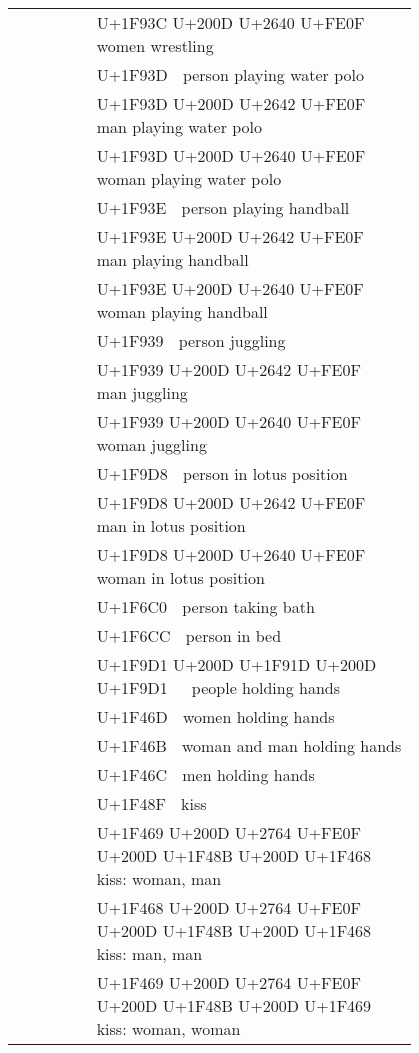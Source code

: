 \documentclass[a4paper,12pt]{ltjarticle}
\newcommand{\fontA}[1]{{\fontspec[RawFeature={mode=harf,+dist,+ccmp}]{Segoe UI Emoji} #1}}
\newcommand{\fontB}[1]{{\fontspec[RawFeature={mode=harf,+dist,+ccmp}]{Noto Color Emoji} #1}}
\begin{document}
\begin{longtable}[c]{ccp{0.8\linewidth}}
\fontA{🤼‍♀️}&\fontB{🤼‍♀️}&U+1F93C U+200D U+2640 U+FE0F 🤼‍♀️ women wrestling\\
\fontA{🤽}&\fontB{🤽}&U+1F93D 🤽 person playing water polo\\
\fontA{🤽‍♂️}&\fontB{🤽‍♂️}&U+1F93D U+200D U+2642 U+FE0F 🤽‍♂️ man playing water polo\\
\fontA{🤽‍♀️}&\fontB{🤽‍♀️}&U+1F93D U+200D U+2640 U+FE0F 🤽‍♀️ woman playing water polo\\
\fontA{🤾}&\fontB{🤾}&U+1F93E 🤾 person playing handball\\
\fontA{🤾‍♂️}&\fontB{🤾‍♂️}&U+1F93E U+200D U+2642 U+FE0F 🤾‍♂️ man playing handball\\
\fontA{🤾‍♀️}&\fontB{🤾‍♀️}&U+1F93E U+200D U+2640 U+FE0F 🤾‍♀️ woman playing handball\\
\fontA{🤹}&\fontB{🤹}&U+1F939 🤹 person juggling\\
\fontA{🤹‍♂️}&\fontB{🤹‍♂️}&U+1F939 U+200D U+2642 U+FE0F 🤹‍♂️ man juggling\\
\fontA{🤹‍♀️}&\fontB{🤹‍♀️}&U+1F939 U+200D U+2640 U+FE0F 🤹‍♀️ woman juggling\\
\fontA{🧘}&\fontB{🧘}&U+1F9D8 🧘 person in lotus position\\
\fontA{🧘‍♂️}&\fontB{🧘‍♂️}&U+1F9D8 U+200D U+2642 U+FE0F 🧘‍♂️ man in lotus position\\
\fontA{🧘‍♀️}&\fontB{🧘‍♀️}&U+1F9D8 U+200D U+2640 U+FE0F 🧘‍♀️ woman in lotus position\\
\fontA{🛀}&\fontB{🛀}&U+1F6C0 🛀 person taking bath\\
\fontA{🛌}&\fontB{🛌}&U+1F6CC 🛌 person in bed\\
\fontA{🧑‍🤝‍🧑}&\fontB{🧑‍🤝‍🧑}&U+1F9D1 U+200D U+1F91D U+200D U+1F9D1 🧑‍🤝‍🧑 people holding hands\\
\fontA{👭}&\fontB{👭}&U+1F46D 👭 women holding hands\\
\fontA{👫}&\fontB{👫}&U+1F46B 👫 woman and man holding hands\\
\fontA{👬}&\fontB{👬}&U+1F46C 👬 men holding hands\\
\fontA{💏}&\fontB{💏}&U+1F48F 💏 kiss\\
\fontA{👩‍❤️‍💋‍👨}&\fontB{👩‍❤️‍💋‍👨}&U+1F469 U+200D U+2764 U+FE0F U+200D U+1F48B U+200D U+1F468 👩‍❤️‍💋‍👨 kiss: woman, man\\
\fontA{👨‍❤️‍💋‍👨}&\fontB{👨‍❤️‍💋‍👨}&U+1F468 U+200D U+2764 U+FE0F U+200D U+1F48B U+200D U+1F468 👨‍❤️‍💋‍👨 kiss: man, man\\
\fontA{👩‍❤️‍💋‍👩}&\fontB{👩‍❤️‍💋‍👩}&U+1F469 U+200D U+2764 U+FE0F U+200D U+1F48B U+200D U+1F469 👩‍❤️‍💋‍👩 kiss: woman, woman\\

\end{longtable}
\end{document}
